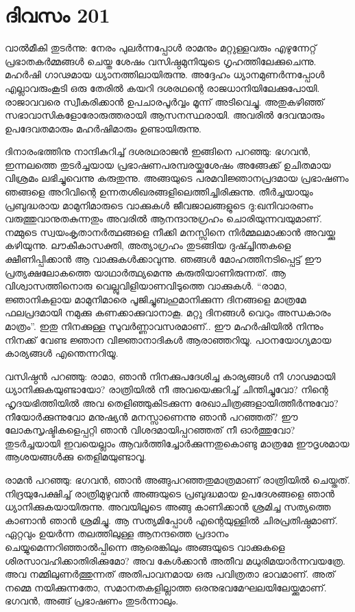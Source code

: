 \section{ദിവസം 201}


വാല്‍മീകി തുടർന്നു: നേരം പുലർന്നപ്പോൾ രാമനും മറ്റുള്ളവരും എഴുന്നേറ്റ് പ്രഭാതകർമ്മങ്ങൾ ചെയ്ത ശേഷം വസിഷ്ഠമുനിയുടെ  ഗൃഹത്തിലേക്കുചെന്നു. മഹർഷി ഗാഢമായ ധ്യാനത്തിലായിരുന്നു. അദ്ദേഹം ധ്യാനമുണർന്നപ്പോൾ എല്ലാവരുംകൂടി ഒരു  തേരിൽ കയറി ദശരഥന്റെ രാജധാനിയിലേക്കുപോയി. രാജാവവരെ സ്വീകരിക്കാൻ ഉപചാരപൂർവ്വം മൂന്ന് അടിവെച്ചു. അതുകഴിഞ്ഞ് സഭാവാസികളോരോരുത്തരായി ആസനസ്ഥരായി. അവരിൽ ദേവന്മാരും ഉപദേവതമാരും മഹർഷിമാരും ഉണ്ടായിരുന്നു.

ദിനാരംഭത്തിനു നാന്ദികുറിച്ച് ദശരഥരാജൻ ഇങ്ങിനെ പറഞ്ഞു: ഭഗവൻ, ഇന്നലത്തെ തുടർച്ചയായ പ്രഭാഷണപരമ്പരയ്ക്കുശേഷം അങ്ങേക്ക് ഉചിതമായ വിശ്രമം ലഭിച്ചുവെന്നു കരുതുന്നു. അങ്ങയുടെ പരമവിജ്ഞാനപ്രദമായ പ്രഭാഷണം ഞങ്ങളെ അറിവിന്റെ ഉന്നതശിഖരങ്ങളിലെത്തിച്ചിരിക്കുന്നു. തീർച്ചയായും പ്രബുദ്ധരായ മാമുനിമാരുടെ വാക്കുകൾ ജീവജാലങ്ങളുടെ ദു:ഖനിവാരണം വരുത്തുവാനുതകുന്നതും അവരിൽ ആനന്ദാനുഗ്രഹം ചൊരിയുന്നവയുമാണ്‌. നമ്മുടെ സ്വയംകൃതാനർത്ഥങ്ങളെ നീക്കി മനസ്സിനെ നിർമ്മലമാക്കാൻ അവയ്ക്കു കഴിയുന്നു. ലൗകീകാസക്തി, അത്യാഗ്രഹം തുടങ്ങിയ ദുഷ്ച്ചിന്തകളെ ക്ഷീണിപ്പിക്കാൻ ആ വാക്കുകൾക്കാവുന്നു. ഞങ്ങൾ മോഹത്തിനടിപ്പെട്ട് ഈ പ്രത്യക്ഷലോകത്തെ യാഥാർത്ഥ്യമെന്നു കരുതിയാണിരുന്നത്. ആ വിശ്വാസത്തിനൊരു വെല്ലുവിളിയാണവിടുത്തെ വാക്കുകൾ.  “രാമാ, ജ്ഞാനികളായ മാമുനിമാരെ പൂജിച്ചുബഹുമാനിക്കുന്ന ദിനങ്ങളെ മാത്രമേ ഫലപ്രദമായി നമുക്കു കണക്കാക്കുവാനാകൂ. മറ്റു ദിനങ്ങൾ വെറും അന്ധകാരം മാത്രം”. ഇതു നിനക്കുള്ള സുവർണ്ണാവസരമാണ്‌.. ഈ മഹർഷിയിൽ നിന്നും നിനക്ക് വേണ്ട ജ്ഞാന വിജ്ഞാനാദികള്‍ ആരാഞ്ഞറിയൂ. പഠനയോഗ്യമായ കാര്യങ്ങൾ എന്തെന്നറിയൂ.

വസിഷ്ഠൻ പറഞ്ഞു: രാമാ, ഞാൻ നിനക്കുപദേശിച്ച കാര്യങ്ങൾ നീ ഗാഢമായി  ധ്യാനിക്കുകയുണ്ടായോ? രാത്രിയിൽ നീ അവയെക്കുറിച്ച് ചിന്തിച്ചുവോ? നിന്റെ ഹൃദയഭിത്തിയിൽ അവ തെളിഞ്ഞുകിടക്കുന്ന രേഖാചിത്രങ്ങളായിത്തീർന്നുവോ? നീയോർക്കുന്നുവോ മനുഷ്യൻ മനസ്സാണെന്നു ഞാൻ പറഞ്ഞത്? ഈ ലോകസൃഷ്ടികളെപ്പറ്റി ഞാൻ വിശദമായിപ്പറഞ്ഞത് നീ ഓർത്തുവോ? തുടർച്ചയായി ഇവയെല്ലാം ആവർത്തിച്ചോർക്കുന്നതുകൊണ്ടു മാത്രമേ ഈദൃശമായ ആശയങ്ങൾക്കു തെളിമയുണ്ടാവൂ.

രാമൻ പറഞ്ഞു: ഭഗവൻ, ഞാൻ അങ്ങുപറഞ്ഞതുമാത്രമാണ്‌ രാത്രിയിൽ ചെയ്തത്. നിദ്രയുപേക്ഷിച്ച് രാത്രിമുഴുവൻ അങ്ങയുടെ പ്രബുദ്ധമായ ഉപദേശങ്ങളെ ഞാൻ ധ്യാനിക്കുകയായിരുന്നു. അവയിലൂടെ അങ്ങു കാണിക്കാൻ ശ്രമിച്ച സത്യത്തെ കാണാൻ ഞാൻ ശ്രമിച്ചു. ആ സത്യമിപ്പോൾ എന്റെയുള്ളിൽ ചിരപ്രതിഷ്ഠമാണ്‌. ഏറ്റവും ഉയർന്ന തലത്തിലുള്ള ആനന്ദത്തെ പ്രദാനം ചെയ്യുമെന്നറിഞ്ഞാൽപ്പിന്നെ ആരെങ്കിലും അങ്ങയുടെ വാക്കുകളെ ശിരസാവഹിക്കാതിരിക്കുമോ? അവ കേൾക്കാൻ അതീവ മധുരിമയാർന്നവയത്രേ. അവ നമ്മിലുണർത്തുന്നത് അതിപാവനമായ ഒരു പവിത്രതാ ഭാവമാണ്. അത്  നമ്മെ നയിക്കുന്നതോ, സമാനതകളില്ലാത്ത ഒരനുഭവമേഘലയിലേയ്ക്കുമാണ്‌. ഭഗവൻ, അങ്ങ്  പ്രഭാഷണം തുടർന്നാലും. 

